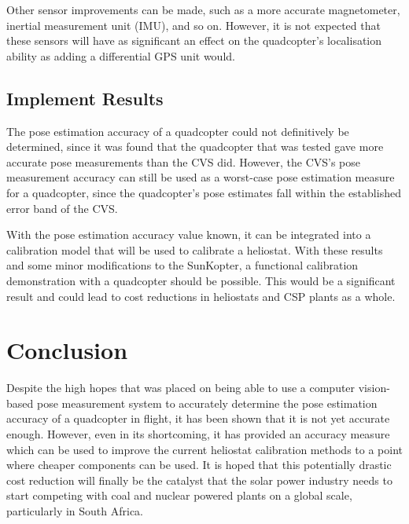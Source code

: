 Other sensor improvements can be made, such as a more accurate magnetometer, inertial measurement unit (IMU), and so on. However, it is not expected that these sensors will have as significant an effect on the quadcopter's localisation ability as adding a differential GPS unit would. 

\subsection{Implement Results}

The pose estimation accuracy of a quadcopter could not definitively be determined, since it was found that the quadcopter that was tested gave more accurate pose measurements than the CVS did. However, the CVS's pose measurement accuracy can still be used as a worst-case pose estimation measure for a quadcopter, since the quadcopter's pose estimates fall within the established error band of the CVS.\@ 

With the pose estimation accuracy value known, it can be integrated into a calibration model that will be used to calibrate a heliostat. With these results and some minor modifications to the SunKopter, a functional calibration demonstration with a quadcopter should be possible. This would be a significant result and could lead to cost reductions in heliostats and CSP plants as a whole.  


\section{Conclusion}

Despite the high hopes that was placed on being able to use a computer vision-based pose measurement system to accurately determine the pose estimation accuracy of a quadcopter in flight, it has been shown that it is not yet accurate enough. However, even in its shortcoming, it has provided an accuracy measure which can be used to improve the current heliostat calibration methods to a point where cheaper components can be used. It is hoped that this potentially drastic cost reduction will finally be the catalyst that the solar power industry needs to start competing with coal and nuclear powered plants on a global scale, particularly in South Africa. 
